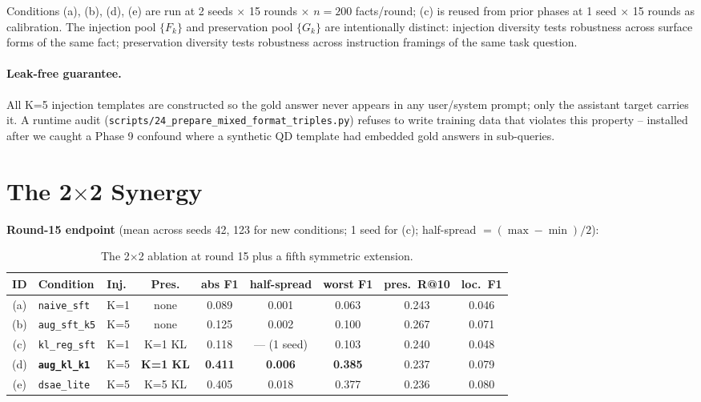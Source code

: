 \documentclass[11pt]{article}
\newcommand{\code}[1]{\texttt{\small #1}}
\begin{document}
Conditions (a), (b), (d), (e) are run at 2 seeds $\times$ 15 rounds
$\times$ $n=200$ facts/round; (c) is reused from prior phases at 1 seed
$\times$ 15 rounds as calibration. The injection pool $\{F_k\}$ and
preservation pool $\{G_k\}$ are intentionally distinct: injection
diversity tests robustness across surface forms of the same fact;
preservation diversity tests robustness across instruction framings of the
same task question.

\paragraph{Leak-free guarantee.}
All K=5 injection templates are constructed so the gold answer never
appears in any user/system prompt; only the assistant target carries it. A
runtime audit (\code{scripts/24\_prepare\_mixed\_format\_triples.py})
refuses to write training data that violates this property -- installed
after we caught a Phase 9 confound where a synthetic QD template had
embedded gold answers in sub-queries.

\section{The 2$\times$2 Synergy}
\label{sec:synergy}

\textbf{Round-15 endpoint} (mean across seeds 42, 123 for new conditions; 1
seed for (c); half-spread $= (\max - \min)/2$):
\begin{table}[h]
\centering
\small
\begin{tabular}{cllcccccc}
\toprule
ID & Condition & Inj. & Pres. & abs F1 & half-spread & worst F1 & pres.\ R@10 & loc.\ F1 \\
\midrule
(a) & \code{naive\_sft}      & K=1 & none      & 0.089 & 0.001 & 0.063 & 0.243 & 0.046 \\
(b) & \code{aug\_sft\_k5}    & K=5 & none      & 0.125 & 0.002 & 0.100 & 0.267 & 0.071 \\
(c) & \code{kl\_reg\_sft}    & K=1 & K=1 KL    & 0.118 & --- (1 seed) & 0.103 & 0.240 & 0.048 \\
(d) & \textbf{\code{aug\_kl\_k1}}  & K=5 & \textbf{K=1 KL}    & \textbf{0.411} & \textbf{0.006} & \textbf{0.385} & 0.237 & 0.079 \\
(e) & \code{dsae\_lite}      & K=5 & K=5 KL    & 0.405 & 0.018 & 0.377 & 0.236 & 0.080 \\
\bottomrule
\end{tabular}
\caption{The 2$\times$2 ablation at round 15 plus a fifth symmetric extension.}
\label{tab:synergy}
\end{table}
\end{document}
